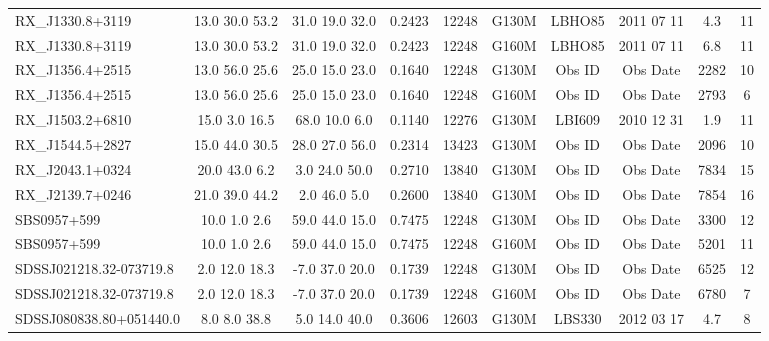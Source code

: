 \documentclass[iop]{emulateapj-rtx4}
\begin{document}
\begin{table}[ht]
\begin{center}
\begin{tabular}{l c c c c c c c c c}
RX\_J1330.8+3119  &         13.0  30.0  53.2  &   31.0  19.0  32.0  &    0.2423  & 12248  &   G130M  &   LBHO85  & 2011 07 11    &    4.3  &       11         \\
RX\_J1330.8+3119  &         13.0  30.0  53.2  &   31.0  19.0  32.0  &    0.2423  & 12248  &   G160M  &   LBHO85  & 2011 07 11    &    6.8  &       11         \\

RX\_J1356.4+2515  &         13.0  56.0  25.6  &   25.0  15.0  23.0  &    0.1640  & 12248  &   G130M  &   Obs ID  & Obs Date  & 2282  &       10         \\
RX\_J1356.4+2515  &         13.0  56.0  25.6  &   25.0  15.0  23.0  &    0.1640  & 12248  &   G160M  &   Obs ID  & Obs Date  & 2793  &       6          \\

RX\_J1503.2+6810  &         15.0  3.0  16.5  &    68.0  10.0  6.0  &     0.1140  & 12276  &   G130M  &   LBI609    & 2010 12 31 &      1.9  &       11         \\

RX\_J1544.5+2827  &         15.0  44.0  30.5  &   28.0  27.0  56.0  &    0.2314  & 13423  &   G130M  &   Obs ID  & Obs Date  & 2096  &       10         \\
RX\_J2043.1+0324  &         20.0  43.0  6.2  &    3.0  24.0  50.0  &     0.2710  & 13840  &   G130M  &   Obs ID  & Obs Date  & 7834  &       15         \\
RX\_J2139.7+0246  &         21.0  39.0  44.2  &   2.0  46.0  5.0  &      0.2600  & 13840  &   G130M  &   Obs ID  & Obs Date  & 7854  &       16         \\
SBS0957+599  &             10.0  1.0  2.6  &     59.0  44.0  15.0  &    0.7475  & 12248  &   G130M  &   Obs ID  & Obs Date  & 3300  &       12         \\
SBS0957+599  &             10.0  1.0  2.6  &     59.0  44.0  15.0  &    0.7475  & 12248  &   G160M  &   Obs ID  & Obs Date  & 5201  &       11         \\
SDSSJ021218.32-073719.8  & 2.0  12.0  18.3  &    -7.0  37.0  20.0  &    0.1739  & 12248  &   G130M  &   Obs ID  & Obs Date  & 6525  &       12         \\
SDSSJ021218.32-073719.8  & 2.0  12.0  18.3  &    -7.0  37.0  20.0  &    0.1739  & 12248  &   G160M  &   Obs ID  & Obs Date  & 6780  &       7          \\

SDSSJ080838.80+051440.0  & 8.0  8.0  38.8  &     5.0  14.0  40.0  &     0.3606  & 12603  &   G130M  &   LBS330   & 2012 03 17  &    4.7  &       8          \\


\end{tabular}
\end{center}
\end{table}
\end{document}
